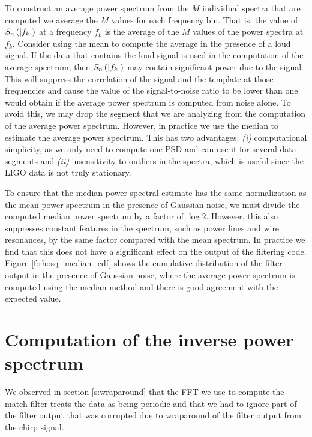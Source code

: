 To construct an average power spectrum from the $M$ individual spectra that
are computed we average the $M$ values for each frequency bin. That is, the
value of $S_n\left(\left|f_{k}\right|\right)$ at a frequency $f_k$ is the average of the $M$ values of
the power spectra at $f_k$. Consider using the mean to compute the average in
the presence of a loud signal. If the data that contains the loud signal is
used in the computation of the average spectrum, then $S_n\left(\left|f_{k}\right|\right)$ may contain
significant power due to the signal. This will suppress the correlation of the
signal and the template at those frequencies and cause the value of the
signal-to-noise ratio to be lower than one would obtain if the average power
spectrum is computed from noise alone. To avoid this, we may drop the segment
that we are analyzing from the computation of the average power spectrum. 
However, in practice we use the median to estimate the average power
spectrum. This has two advantages: \emph{(i)} computational simplicity, as we
only need to compute one PSD and can use it for several data segments and
\emph{(ii)} insensitivity to outliers in the spectra, which is useful since the
LIGO data is not truly stationary.

To ensure that the median power spectral estimate has the same normalization
as the mean power spectrum in the presence of Gaussian noise, we must divide
the computed median power spectrum by a factor of $\log 2$. However, this also
suppresses constant features in the spectrum, such as power lines and wire
resonances, by the same factor compared with the mean spectrum. In practice we
find that this does not have a significant effect on the output of the
filtering code. Figure \ref{f:rhosq_median_cdf} shows the cumulative
distribution of the filter output in the presence of Gaussian noise, where the
average power spectrum is computed using the median method and there is good
agreement with the expected value.

\section{Computation of the inverse power spectrum}
\label{ss:invspec}

We observed in section \ref{s:wraparound} that the FFT we use to compute the
match filter treats the data as being periodic and that we had to ignore part
of the filter output that was corrupted due to wraparound of the filter output
from the chirp signal. 

